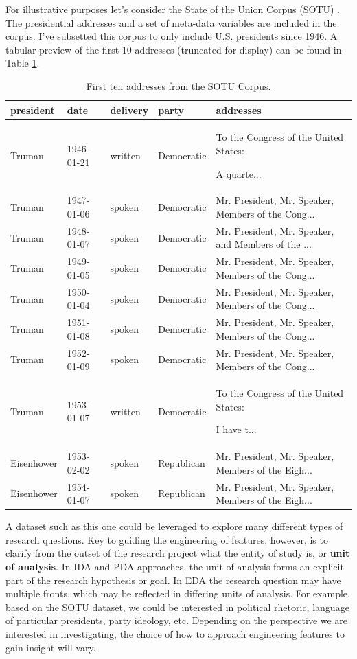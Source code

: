 \documentclass[
]{article}
\begin{document}
For illustrative purposes let's consider the State of the Union Corpus (SOTU) \citep{R-quanteda.corpora}. The presidential addresses and a set of meta-data variables are included in the corpus. I've subsetted this corpus to only include U.S. presidents since 1946. A tabular preview of the first 10 addresses (truncated for display) can be found in Table \ref{tab:eda-sotu-corpus}.

\begin{table}

\caption{\label{tab:eda-sotu-corpus}First ten addresses from the SOTU Corpus.}
\centering
\begin{tabular}[t]{lllll}
\toprule
president & date & delivery & party & addresses\\
\midrule
Truman & 1946-01-21 & written & Democratic & To the Congress of the United States:

A quarte...\\
Truman & 1947-01-06 & spoken & Democratic & Mr. President, Mr. Speaker, Members of the Cong...\\
Truman & 1948-01-07 & spoken & Democratic & Mr. President, Mr. Speaker, and Members of the ...\\
Truman & 1949-01-05 & spoken & Democratic & Mr. President, Mr. Speaker, Members of the Cong...\\
Truman & 1950-01-04 & spoken & Democratic & Mr. President, Mr. Speaker, Members of the Cong...\\
\addlinespace
Truman & 1951-01-08 & spoken & Democratic & Mr. President, Mr. Speaker, Members of the Cong...\\
Truman & 1952-01-09 & spoken & Democratic & Mr. President, Mr. Speaker, Members of the Cong...\\
Truman & 1953-01-07 & written & Democratic & To the Congress of the United States:

I have t...\\
Eisenhower & 1953-02-02 & spoken & Republican & Mr. President, Mr. Speaker, Members of the Eigh...\\
Eisenhower & 1954-01-07 & spoken & Republican & Mr. President, Mr. Speaker, Members of the Eigh...\\
\bottomrule
\end{tabular}
\end{table}

A dataset such as this one could be leveraged to explore many different types of research questions. Key to guiding the engineering of features, however, is to clarify from the outset of the research project what the entity of study is, or \textbf{unit of analysis}. In IDA and PDA approaches, the unit of analysis forms an explicit part of the research hypothesis or goal. In EDA the research question may have multiple fronts, which may be reflected in differing units of analysis. For example, based on the SOTU dataset, we could be interested in political rhetoric, language of particular presidents, party ideology, etc. Depending on the perspective we are interested in investigating, the choice of how to approach engineering features to gain insight will vary.
\end{document}

